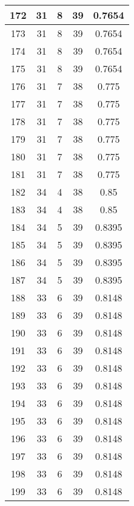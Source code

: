 \documentclass[letterpaper, 12pt]{article}
\begin{document}
\begin{longtable}{|c|c|c|c|c|}
\hline
172 & 31 & 8 & 39 & 0.7654 \\
\hline
173 & 31 & 8 & 39 & 0.7654 \\
\hline
174 & 31 & 8 & 39 & 0.7654 \\
\hline
175 & 31 & 8 & 39 & 0.7654 \\
\hline
176 & 31 & 7 & 38 & 0.775 \\
\hline
177 & 31 & 7 & 38 & 0.775 \\
\hline
178 & 31 & 7 & 38 & 0.775 \\
\hline
179 & 31 & 7 & 38 & 0.775 \\
\hline
180 & 31 & 7 & 38 & 0.775 \\
\hline
181 & 31 & 7 & 38 & 0.775 \\
\hline
182 & 34 & 4 & 38 & 0.85 \\
\hline
183 & 34 & 4 & 38 & 0.85 \\
\hline
184 & 34 & 5 & 39 & 0.8395 \\
\hline
185 & 34 & 5 & 39 & 0.8395 \\
\hline
186 & 34 & 5 & 39 & 0.8395 \\
\hline
187 & 34 & 5 & 39 & 0.8395 \\
\hline
188 & 33 & 6 & 39 & 0.8148 \\
\hline
189 & 33 & 6 & 39 & 0.8148 \\
\hline
190 & 33 & 6 & 39 & 0.8148 \\
\hline
191 & 33 & 6 & 39 & 0.8148 \\
\hline
192 & 33 & 6 & 39 & 0.8148 \\
\hline
193 & 33 & 6 & 39 & 0.8148 \\
\hline
194 & 33 & 6 & 39 & 0.8148 \\
\hline
195 & 33 & 6 & 39 & 0.8148 \\
\hline
196 & 33 & 6 & 39 & 0.8148 \\
\hline
197 & 33 & 6 & 39 & 0.8148 \\
\hline
198 & 33 & 6 & 39 & 0.8148 \\
\hline
199 & 33 & 6 & 39 & 0.8148 \\
\hline
\end{longtable}
\end{document}
